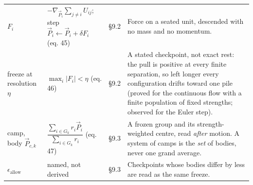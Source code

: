 \documentclass[10.5pt]{article}
\begin{document}
{\begin{longtable}{L{2.0cm}L{6.0cm}L{1.1cm}L{6.9cm}}
$F_i$ & $-\nabla_{\vec P_i}\sum_{j\neq i}U_{ij}$; step $\vec P_i\leftarrow\vec P_i+\delta F_i$ (eq. 45) & §9.2 & Force on a seated unit, descended with no mass and no momentum. \\
freeze at resolution $\eta$ & $\max_i\lvert F_i\rvert<\eta$ (eq. 46) & §9.2 & A stated checkpoint, not exact rest: the pull is positive at every finite separation, so left longer every configuration drifts toward one pile (proved for the continuous flow with a finite population of fixed strengths; observed for the Euler step). \\
camp, body $\vec P_{c,k}$ & $\dfrac{\sum_{i\in G_k}r_i\vec P_i}{\sum_{i\in G_k}r_i}$ (eq. 47) & §9.3 & A frozen group and its strength-weighted centre, read \emph{after} motion. A system of camps is the \emph{set} of bodies, never one grand average. \\
$\epsilon_{\text{allow}}$ & named, not derived & §9.3 & Checkpoints whose bodies differ by less are read as the same freeze. \\
\bottomrule
\end{longtable}}
\end{document}
